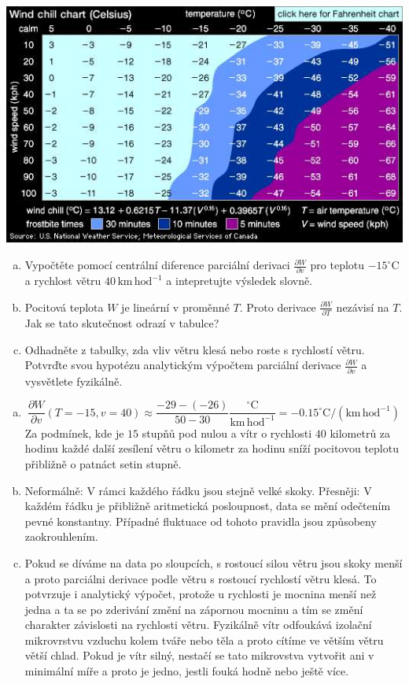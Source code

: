 \includegraphics[width=\linewidth]{air-temperature.jpg}

\begin{enumerate}[a)]
\item Vypočtěte pomocí centrální diference parciální derivaci
$\frac {\partial W}{\partial v}$ pro teplotu $-15^\circ\mathrm C$ a rychlost větru $40\,\mathrm{km}\,\mathrm{hod}^{-1}$ a intepretujte výsledek slovně.
\item Pocitová teplota $W$ je lineární v proměnné $T$. Proto derivace $\frac{\partial W}{\partial T}$ nezávisí na $T$. Jak se tato skutečnost
  odrazí v tabulce?
  \item Odhadněte z tabulky, zda vliv větru klesá nebo roste s rychlostí větru. Potvrďte svou hypotézu analytickým výpočtem parciální derivace $\frac{\partial W}{\partial v}$ a vysvětlete fyzikálně.
\end{enumerate}

\reseni
\begin{enumerate}[a)]
\item
  $$\frac {\partial W}{\partial v}(T=-15,v=40)\approx\frac{-29-(-26)}{50-30}\frac{{}^\circ \mathrm C}{\mathrm{km}\,\mathrm{hod}^{-1}}=-0.15^\circ \mathrm C/(\mathrm{km}\,\mathrm{hod}^{-1})$$
  Za podmínek, kde je $15$ stupňů pod nulou a vítr o rychlosti $40$
kilometrů za hodinu každé další zesílení větru o kilometr za hodinu
sníží pocitovou teplotu přibližně o patnáct setin stupně.
\item Neformálně: V rámci každého řádku jsou stejně velké
  skoky. Přesněji: V každém řádku je přibližně aritmetická
  posloupnost, data se mění odečtením pevné konstantny. Případné
  fluktuace od tohoto pravidla jsou způsobeny zaokrouhlením.
\item Pokud se díváme na data po sloupcích, s rostoucí silou větru
  jsou skoky menší a proto parciálni derivace podle větru s rostoucí
  rychlostí větru klesá. To potvrzuje i analytický výpočet, protože u
  rychlosti je mocnina menší než jedna a ta se po zderivání změní na
  zápornou mocninu a tím se změní charakter závislosti na rychlosti
  větru. Fyzikálně vítr odfoukává izolační mikrovrstvu vzduchu kolem
  tváře nebo těla a proto cítíme ve větším větru větší chlad. Pokud je
  vítr silný, nestačí se tato mikrovstva vytvořit ani v minimální míře
  a proto je jedno, jestli fouká hodně nebo ještě více.
\end{enumerate}
\konec

